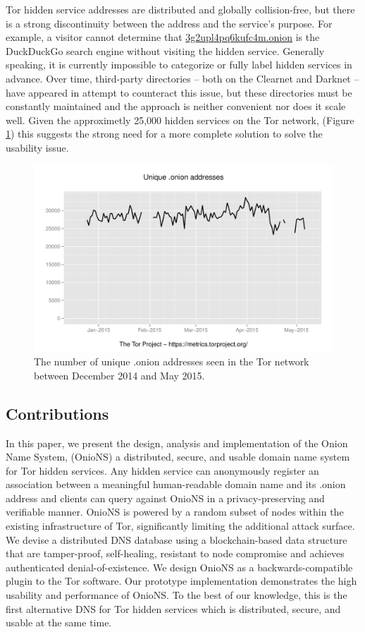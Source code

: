 \documentclass{sig-alternate}
\begin{document}
Tor hidden service addresses are distributed and globally collision-free, but there is a strong discontinuity between the address and the service's purpose. For example, a visitor cannot determine that \url{3g2upl4pq6kufc4m.onion} is the DuckDuckGo search engine without visiting the hidden service. Generally speaking, it is currently impossible to categorize or fully label hidden services in advance. Over time, third-party directories -- both on the Clearnet and Darknet -- have appeared in attempt to counteract this issue, but these directories must be constantly maintained and the approach is neither convenient nor does it scale well. Given the approximetly 25,000 hidden services on the Tor network,  (Figure \ref{fig:OnionCount}) this suggests the strong need for a more complete solution to solve the usability issue. 

\begin{figure}[htbp]
	\centering
	\includegraphics[width=\linewidth]{../images/Tor/onion_2014-10_2015-05.pdf}
	\caption{The number of unique .onion addresses seen in the Tor network between December 2014 and May 2015.\cite{kadianakis2015extrapolating}\cite{TorMetrics}}
	\label{fig:OnionCount}
\end{figure}

\subsection{Contributions}

In this paper, we present the design, analysis and implementation of the Onion Name System, (OnioNS) a distributed, secure, and usable domain name system for Tor hidden services. Any hidden service can anonymously register an association between a meaningful human-readable domain name and its .onion address and clients can query against OnioNS in a privacy-preserving and verifiable manner. OnioNS is powered by a random subset of nodes within the existing infrastructure of Tor, significantly limiting the additional attack surface. We devise a distributed DNS database using a blockchain-based data structure that are tamper-proof, self-healing, resistant to node compromise and achieves authenticated denial-of-existence. We design OnioNS as a backwards-compatible plugin to the Tor software. Our prototype implementation demonstrates the high usability and performance of OnioNS. To the best of our knowledge, this is the first alternative DNS for Tor hidden services which is distributed, secure, and usable at the same time.
\end{document}
